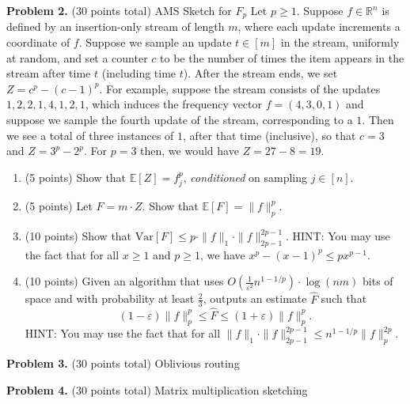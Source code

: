 \documentclass[11pt]{article}
\newcommand{\Ex}[1]{\ensuremath{\mathbb{E}\left[#1\right]}}
\newcommand{\Var}[1]{\ensuremath{\text{Var}\left[#1\right]}}
\newcommand{\eps}{\varepsilon}
\begin{document}
\vskip 0.2in\noindent
\textbf{Problem 2.} (30 points total)
AMS Sketch for $F_p$
\vskip 0.1in\noindent
Let $p\ge 1$. 
Suppose $f\in\mathbb{R}^n$ is defined by an insertion-only stream of length $m$, where each update increments a coordinate of $f$. 
Suppose we sample an update $t\in[m]$ in the stream, uniformly at random, and set a counter $c$ to be the number of times the item appears in the stream after time $t$ (including time $t$). 
After the stream ends, we set $Z=c^p-(c-1)^p$. 
\vskip 0.1in\noindent
For example, suppose the stream consists of the updates $1,2,2,1,4,1,2,1$, which induces the frequency vector $f=(4,3,0,1)$ and suppose we sample the fourth update of the stream, corresponding to a $1$. 
Then we see a total of three instances of $1$, after that time (inclusive), so that $c=3$ and $Z=3^p-2^p$. 
For $p=3$ then, we would have $Z=27-8=19$. 
\begin{enumerate}
\item (5 points)
Show that $\Ex{Z}=f_j^p$, \emph{conditioned} on sampling $j\in[n]$.
\item (5 points)
Let $F=m\cdot Z$. 
Show that $\Ex{F}=\|f\|_p^p$. 
\item (10 points)
Show that $\Var{F}\le p\cdot\|f\|_1\cdot\|f\|_{2p-1}^{2p-1}$. 
\vskip 0.1in\noindent
HINT: You may use the fact that for all $x\ge 1$ and $p\ge 1$, we have $x^p-(x-1)^p\le px^{p-1}$. 
\item (10 points)
Given an algorithm that uses $O\left(\frac{1}{\eps^2}n^{1-1/p}\right)\cdot\log(nm)$ bits of space and with probability at least $\frac{2}{3}$, outputs an estimate $\widehat{F}$ such that
\[(1-\eps)\|f\|_p^p\le\widehat{F}\le(1+\eps)\|f\|_p^p.\]
\vskip 0.1in\noindent
HINT: You may use the fact that for all $\|f\|_1\cdot\|f\|_{2p-1}^{2p-1}\le n^{1-1/p}\|f\|_p^{2p}$. 
\end{enumerate}
\vskip 0.2in\noindent
\textbf{Problem 3.} (30 points total)
Oblivious routing



\vskip 0.2in\noindent
\noindent
\textbf{Problem 4.} (30 points total)
Matrix multiplication sketching
\end{document}
